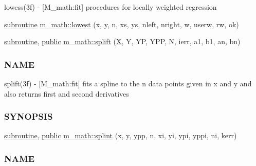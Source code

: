\begin{DoxyCompactItemize}
\begin{DoxyCompactList}
lowess(3f) -\/ \mbox{[}M\+\_\+math\+:fit\mbox{]} procedures for locally weighted regression \end{DoxyCompactList}\item 
\hyperlink{M__stopwatch_83_8txt_acfbcff50169d691ff02d4a123ed70482}{subroutine} \hyperlink{namespacem__math_a06b587e00199906f1f87f1a7b101d71f}{m\+\_\+math\+::lowest} (x, y, n, xs, ys, nleft, nright, w, userw, rw, ok)
\item 
\hyperlink{M__stopwatch_83_8txt_acfbcff50169d691ff02d4a123ed70482}{subroutine}, \hyperlink{M__stopwatch_83_8txt_a2f74811300c361e53b430611a7d1769f}{public} \hyperlink{namespacem__math_a94f09a43f1a68e7971e12ace802dfcc0}{m\+\_\+math\+::splift} (\hyperlink{intro__blas1_83_8txt_ac8596739bc875e90fe6e2ecf98e87906}{X}, Y, YP, Y\+PP, N, ierr, a1, b1, an, bn)
\begin{DoxyCompactList}\small\item\em \subsubsection*{N\+A\+ME}

splift(3f) -\/ \mbox{[}M\+\_\+math\+:fit\mbox{]} fits a spline to the n data points given in x and y and also returns first and second derivatives \subsubsection*{S\+Y\+N\+O\+P\+S\+IS}\end{DoxyCompactList}\item 
\hyperlink{M__stopwatch_83_8txt_acfbcff50169d691ff02d4a123ed70482}{subroutine}, \hyperlink{M__stopwatch_83_8txt_a2f74811300c361e53b430611a7d1769f}{public} \hyperlink{namespacem__math_afb412a273368e2814058a8fc4197ba1a}{m\+\_\+math\+::splint} (x, y, ypp, n, xi, yi, ypi, yppi, ni, kerr)
\begin{DoxyCompactList}\small\item\em \subsubsection*{N\+A\+ME}


\end{DoxyCompactList}
\end{DoxyCompactItemize}
